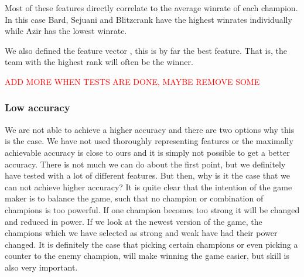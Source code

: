 Most of these features directly correlate to the average winrate of each champion. In this case Bard, Sejuani and Blitzcrank have the highest winrates individually while Azir has the lowest winrate.

We also defined the feature vector , this is by far the best feature. That is, the team with the highest rank will often be the winner.


\textcolor{red}{ADD MORE WHEN TESTS ARE DONE, MAYBE REMOVE SOME}



\subsubsection{Low accuracy}

We are not able to achieve a higher accuracy and there are two options why this is the case. We have not used thoroughly representing features or the maximally achievable accuracy is close to ours and it is simply not possible to get a better accuracy. There is not much we can do about the first point, but we definitely have tested with a lot of different features. But then, why is it the case that we can not achieve higher accuracy? It is quite clear that the intention of the game maker is to balance the game, such that no champion or combination of champions is too powerful. If one champion becomes too strong it will be changed and reduced in power. If we look at the newest version of the game, the champions which we have selected as strong and weak have had their power changed. It is definitely the case that picking certain champions or even picking a counter to the enemy champion, will make winning the game easier, but skill is also very important.


